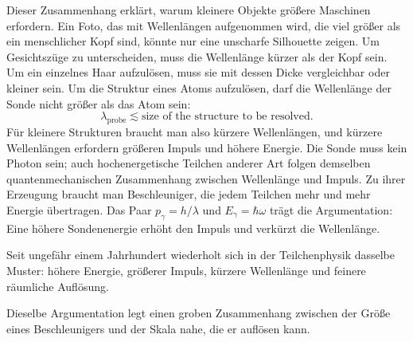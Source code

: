 Dieser Zusammenhang erklärt, warum kleinere Objekte größere Maschinen erfordern. Ein Foto, das mit Wellenlängen aufgenommen wird, die viel größer als ein menschlicher Kopf sind, könnte nur eine unscharfe Silhouette zeigen. Um Gesichtszüge zu unterscheiden, muss die Wellenlänge kürzer als der Kopf sein. Um ein einzelnes Haar aufzulösen, muss sie mit dessen Dicke vergleichbar oder kleiner sein. Um die Struktur eines Atoms aufzulösen, darf die Wellenlänge der Sonde nicht größer als das Atom sein:
\begin{equation}
\lambda_{\mathrm{probe}}\lesssim
\text{size of the structure to be resolved}.
\end{equation}
Für kleinere Strukturen braucht man also kürzere Wellenlängen, und kürzere Wellenlängen erfordern größeren Impuls und höhere Energie. Die Sonde muss kein Photon sein; auch hochenergetische Teilchen anderer Art folgen demselben quantenmechanischen Zusammenhang zwischen Wellenlänge und Impuls. Zu ihrer Erzeugung braucht man Beschleuniger, die jedem Teilchen mehr und mehr Energie übertragen. Das Paar \(p_\gamma=h/\lambda\) und \(E_\gamma=\hbar\omega\) trägt die Argumentation: Eine höhere Sondenenergie erhöht den Impuls und verkürzt die Wellenlänge.

Seit ungefähr einem Jahrhundert wiederholt sich in der Teilchenphysik dasselbe Muster: höhere Energie, größerer Impuls, kürzere Wellenlänge und feinere räumliche Auflösung.

\begin{classroomqa}
\end{classroomqa}

Dieselbe Argumentation legt einen groben Zusammenhang zwischen der Größe eines Beschleunigers und der Skala nahe, die er auflösen kann.

